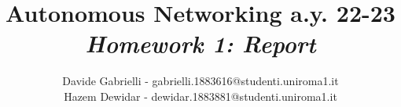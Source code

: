 \documentclass{article}
\title{Autonomous Networking a.y. 22-23\\ \textit{Homework 1: Report}}
\author{
Davide Gabrielli - gabrielli.1883616@studenti.uniroma1.it\\ 
Hazem Dewidar - dewidar.1883881@studenti.uniroma1.it
}
\begin{document}
\maketitle

\sloppy


%
\end{document}
